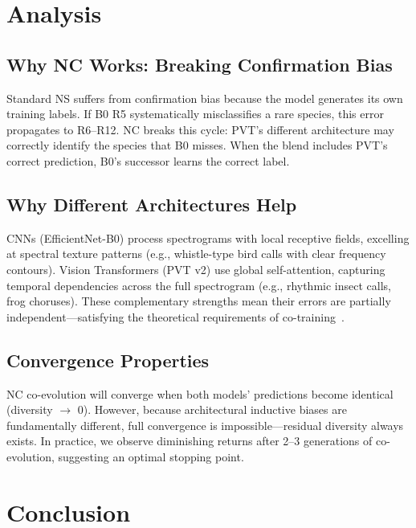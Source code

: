 \documentclass[a4paper]{article}
\begin{document}
\section{Analysis}
\label{sec:analysis}

\subsection{Why NC Works: Breaking Confirmation Bias}

Standard NS suffers from confirmation bias because the model generates its own training labels.
If B0 R5 systematically misclassifies a rare species, this error propagates to R6--R12.
NC breaks this cycle: PVT's different architecture may correctly identify the species that B0 misses.
When the blend includes PVT's correct prediction, B0's successor learns the correct label.

\subsection{Why Different Architectures Help}

CNNs (EfficientNet-B0) process spectrograms with local receptive fields, excelling at spectral texture patterns (e.g., whistle-type bird calls with clear frequency contours).
Vision Transformers (PVT v2) use global self-attention, capturing temporal dependencies across the full spectrogram (e.g., rhythmic insect calls, frog choruses).
These complementary strengths mean their errors are partially independent---satisfying the theoretical requirements of co-training~\citep{blum1998combining}.

\subsection{Convergence Properties}

NC co-evolution will converge when both models' predictions become identical (diversity $\to$ 0).
However, because architectural inductive biases are fundamentally different, full convergence is impossible---residual diversity always exists.
In practice, we observe diminishing returns after 2--3 generations of co-evolution, suggesting an optimal stopping point.

\section{Conclusion}
\label{sec:conclusion}
\end{document}

